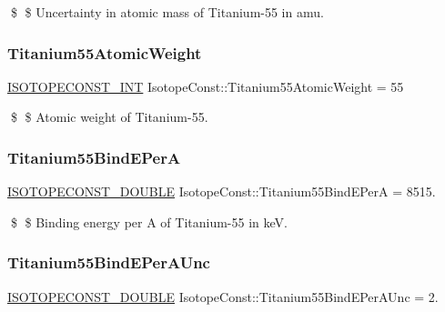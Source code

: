 \$ \$ Uncertainty in atomic mass of Titanium-\/55 in amu. \mbox{\label{group___isotope_const-_titanium-_ti55_ga3b36ffef9f9934c81d95c4ff43534024}} 
\subsubsection{\texorpdfstring{Titanium55\+Atomic\+Weight}{Titanium55AtomicWeight}}
{\footnotesize\ttfamily \mbox{\hyperlink{group___isotope_const-_macros_ga5f18360b3e99483a35c32d789e62621c}{I\+S\+O\+T\+O\+P\+E\+C\+O\+N\+S\+T\+\_\+\+I\+NT}} Isotope\+Const\+::\+Titanium55\+Atomic\+Weight = 55}

\$ \$ Atomic weight of Titanium-\/55. \mbox{\label{group___isotope_const-_titanium-_ti55_ga0695d96ac962072b905520d3fe8025aa}} 
\subsubsection{\texorpdfstring{Titanium55\+Bind\+E\+PerA}{Titanium55BindEPerA}}
{\footnotesize\ttfamily \mbox{\hyperlink{group___isotope_const-_macros_ga8f45a7272ce02c0b4c65c44636ed719a}{I\+S\+O\+T\+O\+P\+E\+C\+O\+N\+S\+T\+\_\+\+D\+O\+U\+B\+LE}} Isotope\+Const\+::\+Titanium55\+Bind\+E\+PerA = 8515.}

\$ \$ Binding energy per A of Titanium-\/55 in keV. \mbox{\label{group___isotope_const-_titanium-_ti55_ga8516bdd74effaf775edec43e1b82fd93}} 
\subsubsection{\texorpdfstring{Titanium55\+Bind\+E\+Per\+A\+Unc}{Titanium55BindEPerAUnc}}
{\footnotesize\ttfamily \mbox{\hyperlink{group___isotope_const-_macros_ga8f45a7272ce02c0b4c65c44636ed719a}{I\+S\+O\+T\+O\+P\+E\+C\+O\+N\+S\+T\+\_\+\+D\+O\+U\+B\+LE}} Isotope\+Const\+::\+Titanium55\+Bind\+E\+Per\+A\+Unc = 2.}


